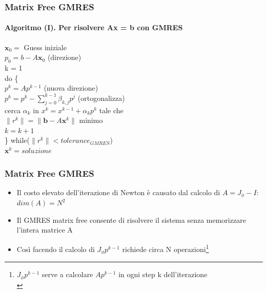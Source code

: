 \documentclass[10pt]{beamer}
\begin{document}
\begin{frame}
\frametitle{Matrix Free GMRES}\framesubtitle{\textbf{Algoritmo (I)}. Per risolvere Ax = b con GMRES}

$\mathbf{x}_0 =$ Guess iniziale\\
$p_0 = b - A\mathbf{x}_0$ (direzione)\\
k = 1\\
do \{\\
$p^k = Ap^{k-1}$ (nuova direzione)\\
$p^k = p^k -\sum\limits_{j=0}^{k-1}\beta_{k,j}p^j$ (ortogonalizza)\\
cerca $\alpha_k$ in $x^k = x^{k -1} + \alpha_kp^k$ tale che\\
$\|r^k\| = \|\mathbf{b} - A\mathbf{x}^k\|$ minimo\\
$k = k + 1$\\
\} while($\|r^k\| < tolerance_{GMRES}$)\\
$\mathbf{x}^k = soluzione$
  
\end{frame}

\begin{frame}
\frametitle{Matrix Free GMRES}
\begin{itemize}
\item Il costo elevato dell'iterazione di Newton è causato dal calcolo di $ A = J_\phi - I$: $dim(A) = N^2$
\item Il GMRES matrix free consente di risolvere il sistema senza memorizzare l'intera matrice A  
\item 
Così facendo il calcolo di $J_\phi p^{k-1}$ richiede circa N operazioni\footnote{$J_\phi p^{k-1}$ serve a calcolare $Ap^{k-1}$ in ogni step k dell'iterazione \\}
\end{itemize}
\end{frame}
\end{document}

